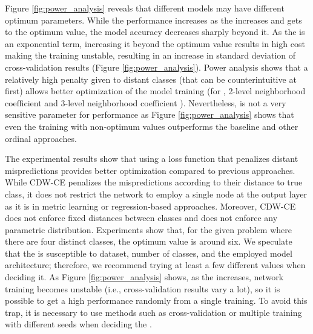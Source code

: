\documentclass[runningheads]{llncs}
\begin{document}
Figure \ref{fig:power_analysis} reveals that different models may have different optimum  parameters. While the performance increases as the  increases and gets to the optimum value, the model accuracy decreases sharply beyond it. As the  is an exponential term, increasing it beyond the optimum value results in high cost making the training unstable, resulting in an increase in standard deviation of cross-validation results (Figure \ref{fig:power_analysis}). Power analysis shows that a relatively high penalty given to distant classes (that can be counterintuitive at first) allows better optimization of the model training (for ,  2-level neighborhood coefficient  and 3-level neighborhood coefficient ). Nevertheless,  is not a very sensitive parameter for performance as Figure \ref{fig:power_analysis} shows that even the training with non-optimum  values outperforms the baseline and other ordinal approaches.

The experimental results show that using a loss function that penalizes distant mispredictions provides better optimization compared to previous approaches. While CDW-CE penalizes the mispredictions according to their distance to true class, it does not restrict the network to employ a single node at the output layer as it is in metric learning or regression-based approaches. Moreover, CDW-CE does not enforce fixed distances between classes and does not enforce any parametric distribution. Experiments show that, for the given problem where there are four distinct classes, the optimum  value is around six. We speculate that the  is susceptible to dataset, number of classes, and the employed model architecture; therefore, we recommend trying at least a few different values when deciding it. As Figure \ref{fig:power_analysis} shows, as the  increases, network training becomes unstable (i.e., cross-validation results vary a lot), so it is possible to get a high performance randomly from a single training. To avoid this trap, it is necessary to use methods such as cross-validation or multiple training with different seeds when deciding the .
\end{document}
